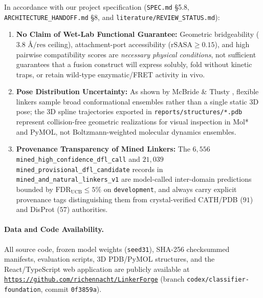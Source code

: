 \documentclass[11pt]{article}
\begin{document}
In accordance with our project specification (\texttt{SPEC.md} \S5.8, \texttt{ARCHITECTURE\_HANDOFF.md} \S8, and \texttt{literature/REVIEW\_STATUS.md}):
\begin{enumerate}
  \item \textbf{No Claim of Wet-Lab Functional Guarantee:} Geometric bridgeability ($3.8\text{ \AA/res}$ ceiling), attachment-port accessibility ($\text{rSASA} \ge 0.15$), and high pairwise compatibility scores are \emph{necessary physical conditions}, not sufficient guarantees that a fusion construct will express solubly, fold without kinetic traps, or retain wild-type enzymatic/FRET activity in vivo.
  \item \textbf{Pose Distribution Uncertainty:} As shown by McBride \& Tlusty \cite{mcbride2026pose}, flexible linkers sample broad conformational ensembles rather than a single static 3D pose; the 3D spline trajectories exported in \texttt{reports/structures/*.pdb} represent collision-free geometric realizations for visual inspection in Mol* and PyMOL, not Boltzmann-weighted molecular dynamics ensembles.
  \item \textbf{Provenance Transparency of Mined Linkers:} The $6{,}556$ \texttt{mined\_high\_confidence\_dfl\_call} and $21{,}039$ \texttt{mined\_provisional\_dfl\_candidate} records in \texttt{mined\_and\_natural\_linkers\_v1} are model-called inter-domain predictions bounded by $\text{FDR}_{\text{UCB}} \le 5\%$ on \texttt{development}, and always carry explicit provenance tags distinguishing them from crystal-verified CATH/PDB ($91$) and DisProt ($57$) authorities.
\end{enumerate}

\paragraph{Data and Code Availability.}
All source code, frozen model weights (\texttt{seed31}), SHA-256 checksummed manifests, evaluation scripts, 3D PDB/PyMOL structures, and the React/TypeScript web application are publicly available at \href{https://github.com/richennacht/LinkerForge}{\texttt{https://github.com/richennacht/LinkerForge}} (branch \texttt{codex/classifier-foundation}, commit \texttt{0f3859a}).



\end{document}
